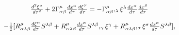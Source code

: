 \begin{equation}
\begin{array}{c}
\frac{d^{2}\xi ^{\mu }}{d\tau ^{2}}+2\Gamma _{\alpha \beta }^{\mu }\frac{%
dx^{\alpha }}{d\tau }\frac{d\xi ^{\beta }}{d\tau }=-\Gamma _{\alpha \beta
}^{\mu },_{\lambda }\xi ^{\lambda }\frac{dx^{\alpha }}{d\tau }\frac{%
dx^{\beta }}{d\tau } \\ 
\\ 
-\frac{1}{2}[R_{\alpha \lambda \beta }^{\mu }\frac{d\xi ^{\alpha }}{d\tau }%
S^{\lambda \beta }+R_{\alpha \lambda \beta }^{\mu }\frac{dx^{\alpha }}{d\tau 
}S^{\lambda \beta },_{\gamma }\xi ^{\gamma }+R_{\alpha \lambda \beta }^{\mu
},_{\sigma }\xi ^{\sigma }\frac{dx^{\alpha }}{d\tau }S^{\lambda \beta }],
\end{array}
\label{22}
\end{equation}

